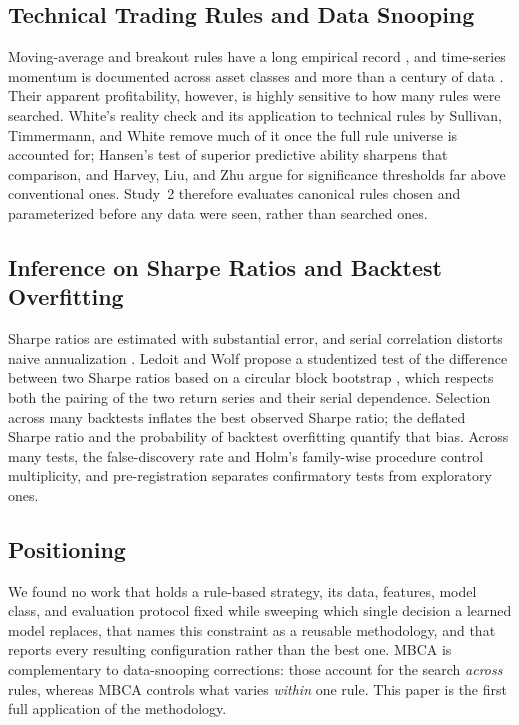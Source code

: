 \subsection{Technical Trading Rules and Data Snooping}

Moving-average and breakout rules have a long empirical record \cite{brock1992simple,park2007technical}, and
time-series momentum is documented across asset classes and more than a century of data
\cite{moskowitz2012momentum,hurst2017century}. Their apparent profitability, however, is highly sensitive to how many
rules were searched. White's reality check \cite{white2000reality} and its application to technical rules by
Sullivan, Timmermann, and White \cite{sullivan1999data} remove much of it once the full rule universe is accounted
for; Hansen's test of superior predictive ability \cite{hansen2005spa} sharpens that comparison, and Harvey, Liu, and
Zhu \cite{harvey2016cross} argue for significance thresholds far above conventional ones. Study~2 therefore evaluates
canonical rules chosen and parameterized before any data were seen, rather than searched ones.

\subsection{Inference on Sharpe Ratios and Backtest Overfitting}

Sharpe ratios are estimated with substantial error, and serial correlation distorts naive annualization
\cite{lo2002sharpe}. Ledoit and Wolf \cite{ledoit2008robust} propose a studentized test of the difference between
two Sharpe ratios based on a circular block bootstrap \cite{politis1992circular}, which respects both the pairing of
the two return series and their serial dependence. Selection across many backtests inflates the best observed Sharpe
ratio; the deflated Sharpe ratio \cite{bailey2014deflated} and the probability of backtest overfitting
\cite{bailey2017pbo} quantify that bias. Across many tests, the false-discovery rate \cite{benjamini1995fdr} and Holm's
family-wise procedure \cite{holm1979simple} control multiplicity, and pre-registration \cite{nosek2018preregistration}
separates confirmatory tests from exploratory ones.

\subsection{Positioning}

We found no work that holds a rule-based strategy, its data, features, model class, and evaluation protocol fixed
while sweeping which single decision a learned model replaces, that names this constraint as a reusable
methodology, and that reports every resulting configuration rather than the best one. MBCA is complementary to
data-snooping corrections: those account for the search \emph{across} rules, whereas MBCA controls what varies
\emph{within} one rule. This paper is the first full application of the methodology.
